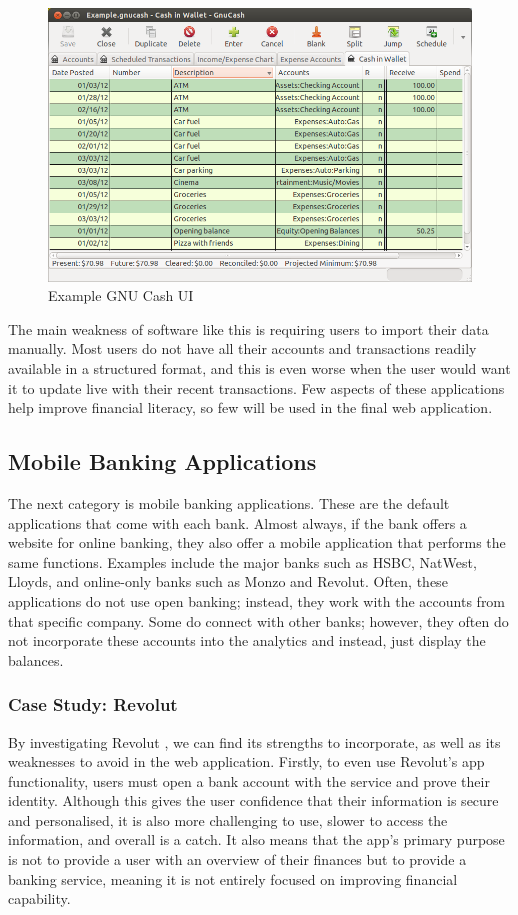 \begin{figure}[H]
    \centering
    \includegraphics[width=\textwidth]{images/gnucash.png}
    \caption{Example GNU Cash UI \cite{GNUCashUI}}
    \label{fig:gnucash_ui}
\end{figure}

The main weakness of software like this is requiring users to import their data manually. Most users do not have all their accounts and transactions readily available in a structured format, and this is even worse when the user would want it to update live with their recent transactions. Few aspects of these applications help improve financial literacy, so few will be used in the final web application.

\subsection{Mobile Banking Applications}
\label{sec:mobile-banking-applications}
The next category is mobile banking applications. These are the default applications that come with each bank. Almost always, if the bank offers a website for online banking, they also offer a mobile application that performs the same functions. Examples include the major banks such as HSBC, NatWest, Lloyds, and online-only banks such as Monzo and Revolut. Often, these applications do not use open banking; instead, they work with the accounts from that specific company. Some do connect with other banks; however, they often do not incorporate these accounts into the analytics and instead, just display the balances.

\subsubsection{Case Study: Revolut}
By investigating Revolut \cite{RevolutWebsite}, we can find its strengths to incorporate, as well as its weaknesses to avoid in the web application. Firstly, to even use Revolut's app functionality, users must open a bank account with the service and prove their identity. Although this gives the user confidence that their information is secure and personalised, it is also more challenging to use, slower to access the information, and overall is a catch. It also means that the app's primary purpose is not to provide a user with an overview of their finances but to provide a banking service, meaning it is not entirely focused on improving financial capability.

